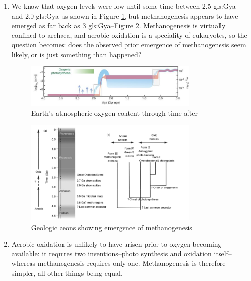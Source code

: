 \documentclass[]{article}
\begin{document}
\begin{enumerate}
	\item We know that oxygen levels were low until some time between 2.5 \gls{gls:Gya} and 2.0 \gls{gls:Gya}--as shown in Figure \ref{fig:nature13068-f1}, but  methanogenesis appears to have emerged as far back as 3 \gls{gls:Gya}--Figure \ref{fig:nisbet2011evolution}. Methanogenesis is virtually confined to archaea\cite{angel2012methanogenic}, and aerobic oxidation is a speciality of eukaryotes, so the question becomes: does the observed prior emergence of methanogenesis seem likely, or is just something than happened?
	\begin{figure}[H]
		\caption{Earth’s atmospheric oxygen content through time after \cite{lyons2014rise} }\label{fig:nature13068-f1}
		\includegraphics[width=0.8\textwidth]{nature13068-f1}
	\end{figure}
	
	\begin{figure}[H]
		\caption{Geologic aeons showing emergence of methanogenesis\cite{nisbet2011evolution}}\label{fig:nisbet2011evolution}
		\includegraphics[width=0.8\textwidth]{nisbet2011evolution}
	\end{figure}
	
	\item Aerobic oxidation is unlikely to have arisen prior to oxygen becoming available: it requires two inventions--photo synthesis and oxidation itself--whereas methanogenesis requires only one. Methanogenesis is therefore simpler, all other things being equal.
	

\end{enumerate}
\end{document}
